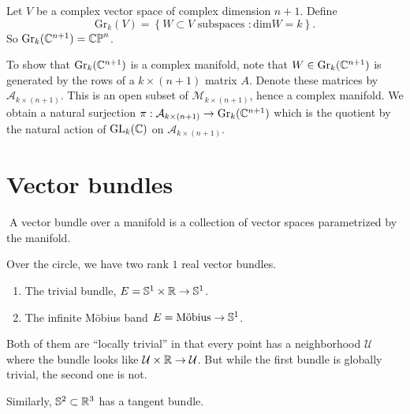 \begin{example}
  Let $V$ be a complex vector space of complex dimension  $n+1$. Define  
  \[
    \mathrm{Gr}_k(V)=\left\{W\subset V \text{ subspaces }:\mathrm{dim}W=k\right\}.
  \] 
  So $\mathrm{Gr}_k(\mathbb{C}^{n+1})=\mathbb{CP}^{n}$.

  To show that $\mathrm{Gr}_k(\mathbb{C}^{n+1})$ is a complex manifold, note that $W\in \mathrm{Gr}_k(\mathbb{C}^{n+1})$ is generated by the rows of a $k\times (n+1)$ matrix $A$. Denote these matrices by $\mathcal{A}_{k\times (n+1)}$. This is an open subset of $\mathcal{M}_{k\times (n+1)}$, hence a complex manifold. We obtain a natural surjection $\pi:\mathcal{A}_{k\times (n+1)}\to \mathrm{Gr}_k(\mathbb{C}^{n+1})$ which is the quotient by the natural action of $\operatorname{GL}_k(\mathbb{C})$ on $\mathcal{A}_{k\times (n+1)}$. 
\end{example}

\section{Vector bundles}

\begin{definition}
  A vector bundle over a manifold is a collection of vector spaces parametrized by the manifold.
\end{definition}
\begin{example}  
Over the circle, we have two rank $1$ real vector bundles.
\begin{enumerate}
  \item The trivial bundle, $E=\mathbb{S}^{1}\times \mathbb{R}\to \mathbb{S}^{1}$.
  \item The infinite M\"{o}bius band $E=\text{M\"{o}bius}\to \mathbb{S}^{1}$.
\end{enumerate}
Both of them are ``locally trivial'' in that every point has a neighborhood $\mathcal{U}$ where the bundle looks like $\mathcal{U}\times \mathbb{R}\to \mathcal{U}$. But while the first bundle is globally trivial, the second one is not.

Similarly, $\mathbb{S}^2\subset \mathbb{R}^3$ has a tangent bundle.
\end{example}

